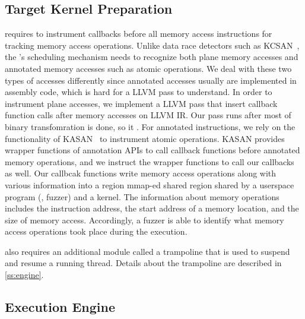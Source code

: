 \subsection{Target Kernel Preparation}
\label{ss:instrumentation}

\sys requires to instrument callbacks before all memory access
instructions for tracking memory access operations.
%
Unlike data race detectors such as KCSAN~\cite{kcsan}, the \sys's
scheduling mechanism needs to recognize both plane memory accesses and
annotated memory accesses such as atomic operations.
%
We deal with these two types of accesses differently since annotated
accesses usually are implemented in assembly code, which is hard for a
LLVM pass to understand.
%
In order to instrument plane accesses, we implement a LLVM pass that
insert callback function calls after memory accesses on LLVM IR.
%
Our pass runs after most of binary transfomration is done, so it
.
%
For annotated instructions, we rely on the functionality of
KASAN~\cite{kasan} to instrument atomic operations.
%
KASAN provides wrapper functions of annotation APIs to call callback
functions before annotated memory operations, and we instruct the
wrapper functions to call our callbacks as well.
%
Our callbcak functions write memory access operations along with
various information into a region mmap-ed shared region shared by a
userspace program (\ie, fuzzer) and a kernel. The information about
memory operations includes the instruction address, the start address
of a memory location, and the size of memory access.
%
Accordingly, a fuzzer is able to identify what memory access
operations took place during the execution.

\sys also requires an additional module called a trampoline that is
used to suspend and resume a running thread. Details about the
trampoline are described in \autoref{ss:engine}.


\subsection{Execution Engine}
\label{ss:engine}

